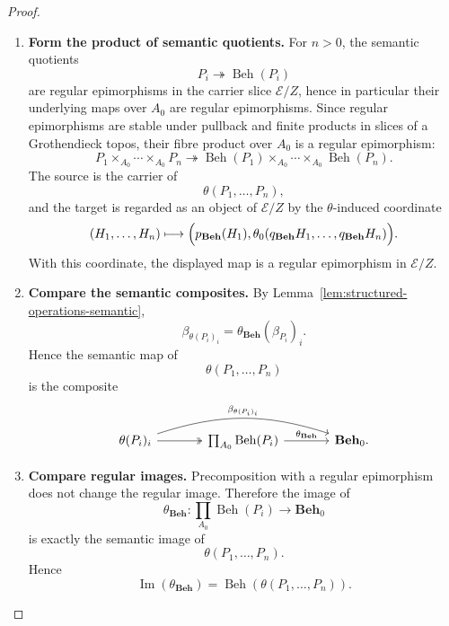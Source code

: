 \begin{proof}
    \leavevmode
    \begin{enumerate}
        \item \textbf{Form the product of semantic quotients.}
        For \(n>0\), the semantic quotients
        \[
            P_i\twoheadrightarrow\operatorname{Beh}(P_i)
        \]
        are regular epimorphisms in the carrier slice \(\mathcal E/Z\), hence
        in particular their underlying maps over \(A_0\) are regular
        epimorphisms. Since regular epimorphisms are stable under pullback and
        finite products in slices of a Grothendieck topos, their fibre product
        over \(A_0\) is a regular epimorphism:
        \[
            P_1\times_{A_0}\cdots\times_{A_0}P_n
            \twoheadrightarrow
            \operatorname{Beh}(P_1)\times_{A_0}\cdots\times_{A_0}
            \operatorname{Beh}(P_n).
        \]
        The source is the carrier of
        \[
            \theta(P_1,\dots,P_n),
        \]
        and the target is regarded as an object of \(\mathcal E/Z\) by the
        \(\theta\)-induced coordinate
        \[
            (H_1,\dots,H_n)
            \longmapsto
            \Bigl(
                p_{\mathbf{Beh}}(H_1),
                \theta_0(q_{\mathbf{Beh}}H_1,\dots,q_{\mathbf{Beh}}H_n)
            \Bigr).
        \]
        With this coordinate, the displayed map is a regular epimorphism in
        \(\mathcal E/Z\).

        \item \textbf{Compare the semantic composites.}
        By Lemma~\ref{lem:structured-operations-semantic},
        \[
            \beta_{\theta(P_i)_i}
            =
            \theta_{\mathbf{Beh}}(\beta_{P_i})_i.
        \]
        Hence the semantic map of
        \[
            \theta(P_1,\dots,P_n)
        \]
        is the composite
        \[
        \begin{tikzcd}[column sep=large, row sep=large]
            \theta(P_i)_i
                \arrow[r, two heads]
                \arrow[rr, bend left=18, "\beta_{\theta(P_i)_i}"]
            &
            \prod_{A_0}\operatorname{Beh}(P_i)
                \arrow[r, "\theta_{\mathbf{Beh}}"]
            &
            \mathbf{Beh}_0 .
        \end{tikzcd}
        \]

        \item \textbf{Compare regular images.}
        Precomposition with a regular epimorphism does not change the regular
        image. Therefore the image of
        \[
            \theta_{\mathbf{Beh}}:
            \prod_{A_0}\operatorname{Beh}(P_i)
            \to
            \mathbf{Beh}_0
        \]
        is exactly the semantic image of
        \[
            \theta(P_1,\dots,P_n).
        \]
        Hence
        \[
            \operatorname{Im}(\theta_{\mathbf{Beh}})
            =
            \operatorname{Beh}(\theta(P_1,\dots,P_n)).
        \]


\end{enumerate}
\end{proof}
